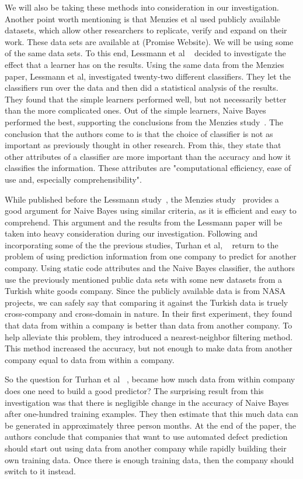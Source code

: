 \documentclass{sig-alternate}
\begin{document}
We will also be taking these methods into consideration in our investigation.  Another point worth mentioning is that Menzies et al used publicly available datasets, which allow other researchers to replicate, verify and expand on their work. 
These data sets are available at (Promise Website).  We will be using some of the same data sets.  To this end, Lessmann et al ~\cite{Lessmann08} decided to investigate the effect that a learner has on the results.  Using the same data from the Menzies paper,
Lessmann et al, investigated twenty-two different classifiers.  They let the classifiers run over the data and then did a statistical analysis of the results.  They found that the simple learners performed well, but not necessarily better than the more
complicated ones.  Out of the simple learners, Naive Bayes performed the best, supporting the conclusions from the Menzies study~\cite{Menzies07}.  The conclusion that the authors come to is that the choice of classifier is not as important as previously thought
in other research.  From this, they state that other attributes of a classifier are more important than the accuracy and how it classifies the information.  These attributes are "computational efficiency, ease of use and, especially comprehensibility".  

While published before the Lessmann study~\cite{Lessmann08}, the Menzies study~\cite{Menzies07} provides a good argument for Naive Bayes using similar criteria, as it is efficient and easy to comprehend.   This argument and the results from the Lessmann paper will be taken into heavy consideration during our investigation.  Following and incorporating some of the the previous studies, Turhan et al, ~\cite{Turhan2009} return to the problem of using prediction information from one company to predict for another company.  Using static code attributes and the Naive Bayes classifier, the authors use the previously mentioned public data sets with some new datasets from a Turkish white goods company.  Since the publicly available data is from NASA projects, we can safely say that comparing it against the Turkish data is truely cross-company and cross-domain in nature.  In their first experiment, they found that data from within a company is better than data from another company.  To help alleviate this problem, they introduced a nearest-neighbor filtering method.  This method increased the accuracy, but not enough to make data from another company equal to data from within a company.  

So the question for Turhan et al ~\cite{Turhan2009}, became how much data from within company does one need to build a good predictor?  The surprising result from this investigation was that there is negligible change in the accuracy of Naive Bayes after one-hundred training examples.  They then estimate that this much data can be generated in approximately three person months.  At the end of the paper, the authors conclude that companies that want to use automated defect prediction should start out using data from another company while rapidly building their own training data.  Once there is enough training data, then the company should switch to it instead.  
\end{document}
